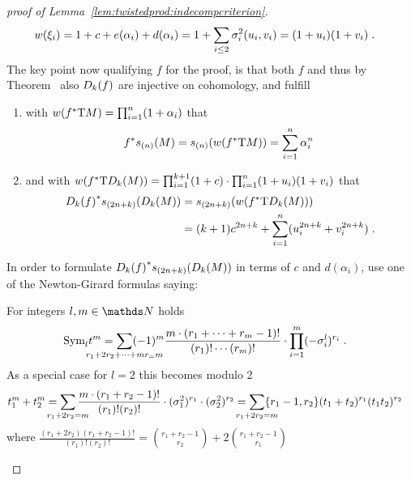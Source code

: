 \begin{proof}[proof of Lemma~\ref{lem:twistedprod:indecompcriterion}]
\begin{align*}
    {w}(\xi_i)  &= 1+c+e(\alpha_i)+d(\alpha_i)
                 = 1+\sum_{i\leq2}\sigma_{i}^{2}(u_i,v_i) = (1+u_i)(1+v_i)
                 \;.
  \end{align*}
  The key point now qualifying $f$ for the proof, is that both $f$ and
  thus by
  Theorem~
  also $D_{k}({f})$ are injective on cohomology, and fulfill
  \begin{enumerate}
  \item with ${w}({f}^*\mathrm{T}M) = \prod_{i=1}^n (1+\alpha_i)$ that
    \begin{gather}\label{eq:lem:twistedprod:indecompcriterion:sM}
      {f}^* s_{(n)}(M)
      = s_{(n)}({w}({f}^*\mathrm{T}M))
      = \sum_{i=1}^n \alpha_i^n
      \;
    \end{gather}
  \item and with
    ${w}({f}^*\mathrm{T}D_{k}({M}))
    = \prod_{i=1}^{k+1}(1+c) \cdot \prod_{i=1}^n
    (1+u_i)(1+v_i)$
    that
    \begin{align}\notag
      {D_{k}({f})}^* s_{(2n+k)}(D_{k}({M}))
      &= s_{(2n+k)}({w}({f}^*\mathrm{T}D_{k}({M}))) \\
      \label{eq:lem:twistedprod:indecompcriterion:sDkM}
      &= (k+1)c^{2n+k} + \sum_{i=1}^n (u_i^{2n+k} + v_i^{2n+k})
        \;.
    \end{align}
  \end{enumerate}
  In order to formulate
  ${D_{k}({f})}^*s_{(2n+k)}(D_{k}({M}))$ 
  in terms of $c$ and $d(\alpha_i)$,
  use one of the Newton-Girard formulas saying:
  \begin{Lem}
    For integers $l, m\in\Nat$ holds
    \begin{align*}
      \symm{l} t^m
      &= \sum_{\mathclap{r_1+2r_2+\dotsb+mr_=m}}
        (-1)^m \frac{m\cdot(r_1+\dotsb+r_m-1)!}{(r_1)!\dotsm(r_m)!}
        \cdot \prod_{i=1}^m (-\el i l)^{r_i}
        \;.
    \end{align*}
    As a special case for $l=2$ this becomes modulo 2
    \begin{align*}
      t_1^m + t_2^m
      &= \sum_{\mathclap{r_1+2r_2=m}}
        \frac{m\cdot(r_1+r_2-1)!}{(r_1)!(r_2)!}
        \cdot (\el 1 2)^{r_1} \cdot (\el 2 2)^{r_2}
        = \sum_{\mathclap{r_1+2r_2=m}}
        \altbinom{r_1-1}{r_2} (t_1+t_2)^{r_1}(t_1t_2)^{r_2}
    \end{align*}
    where $\frac{(r_1+2r_2)(r_1+r_2-1)!}{(r_1)!(r_2)!}
    = \binom{r_1+r_2-1}{r_2} + 2\binom{r_1+r_2-1}{r_1}$

\end{Lem}
\end{proof}
